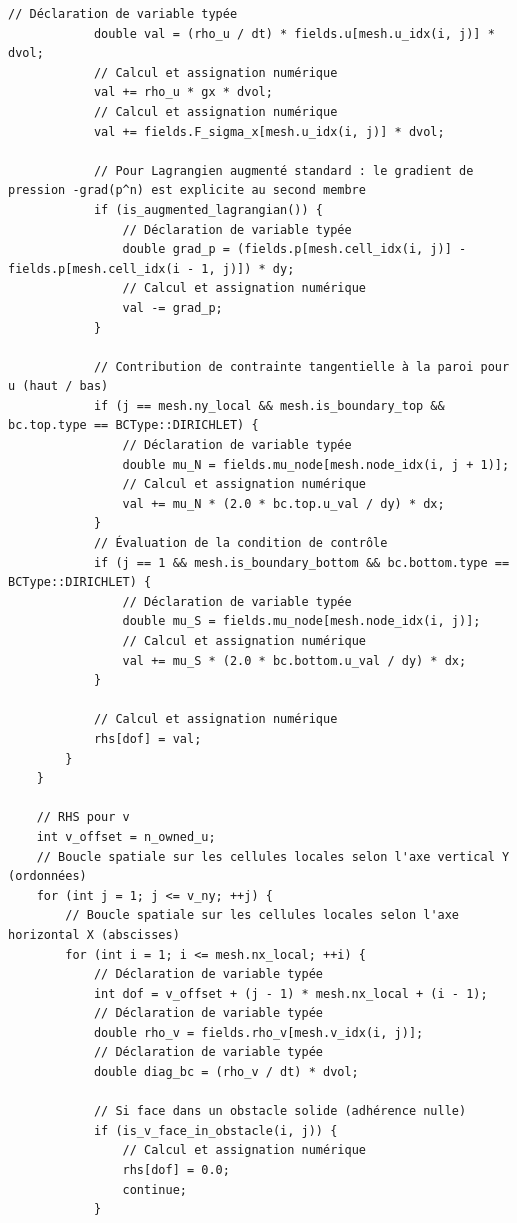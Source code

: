 \documentclass[10pt,a4paper,oneside]{book}
\begin{document}
\begin{lstlisting}[language={[11]C++}]
            // Déclaration de variable typée
            double val = (rho_u / dt) * fields.u[mesh.u_idx(i, j)] * dvol;
            // Calcul et assignation numérique
            val += rho_u * gx * dvol;
            // Calcul et assignation numérique
            val += fields.F_sigma_x[mesh.u_idx(i, j)] * dvol;

            // Pour Lagrangien augmenté standard : le gradient de pression -grad(p^n) est explicite au second membre
            if (is_augmented_lagrangian()) {
                // Déclaration de variable typée
                double grad_p = (fields.p[mesh.cell_idx(i, j)] - fields.p[mesh.cell_idx(i - 1, j)]) * dy;
                // Calcul et assignation numérique
                val -= grad_p;
            }

            // Contribution de contrainte tangentielle à la paroi pour u (haut / bas)
            if (j == mesh.ny_local && mesh.is_boundary_top && bc.top.type == BCType::DIRICHLET) {
                // Déclaration de variable typée
                double mu_N = fields.mu_node[mesh.node_idx(i, j + 1)];
                // Calcul et assignation numérique
                val += mu_N * (2.0 * bc.top.u_val / dy) * dx;
            }
            // Évaluation de la condition de contrôle
            if (j == 1 && mesh.is_boundary_bottom && bc.bottom.type == BCType::DIRICHLET) {
                // Déclaration de variable typée
                double mu_S = fields.mu_node[mesh.node_idx(i, j)];
                // Calcul et assignation numérique
                val += mu_S * (2.0 * bc.bottom.u_val / dy) * dx;
            }

            // Calcul et assignation numérique
            rhs[dof] = val;
        }
    }

    // RHS pour v
    int v_offset = n_owned_u;
    // Boucle spatiale sur les cellules locales selon l'axe vertical Y (ordonnées)
    for (int j = 1; j <= v_ny; ++j) {
        // Boucle spatiale sur les cellules locales selon l'axe horizontal X (abscisses)
        for (int i = 1; i <= mesh.nx_local; ++i) {
            // Déclaration de variable typée
            int dof = v_offset + (j - 1) * mesh.nx_local + (i - 1);
            // Déclaration de variable typée
            double rho_v = fields.rho_v[mesh.v_idx(i, j)];
            // Déclaration de variable typée
            double diag_bc = (rho_v / dt) * dvol;

            // Si face dans un obstacle solide (adhérence nulle)
            if (is_v_face_in_obstacle(i, j)) {
                // Calcul et assignation numérique
                rhs[dof] = 0.0;
                continue;
            }


\end{lstlisting}
\end{document}
